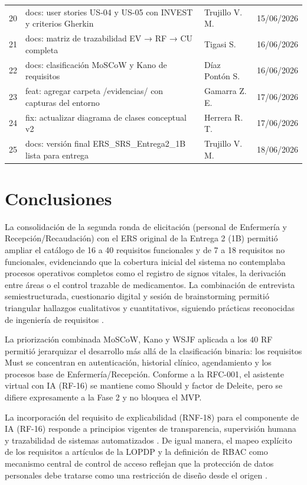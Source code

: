 \documentclass[11pt,a4paper]{article}
\begin{document}
\begin{longtable}{p{} p{} p{} p{}}
		20 & docs: user stories US-04 y US-05 con INVEST y criterios Gherkin & Trujillo V. M. & 15/06/2026 \\
		21 & docs: matriz de trazabilidad EV → RF → CU completa & Tigasi S. & 16/06/2026 \\
		22 & docs: clasificación MoSCoW y Kano de requisitos & Díaz Pontón S. & 16/06/2026 \\
		23 & feat: agregar carpeta /evidencias/ con capturas del entorno & Gamarra Z. E. & 17/06/2026 \\
		24 & fix: actualizar diagrama de clases conceptual v2 & Herrera R. T. & 17/06/2026 \\
		25 & docs: versión final ERS\_SRS\_Entrega2\_1B lista para entrega & Trujillo V. M. & 18/06/2026 \\
	\end{longtable}
	
	
	\section{Conclusiones}
	
	La consolidación de la segunda ronda de elicitación (personal de Enfermería y Recepción/Recaudación) con el ERS original de la Entrega 2 (1B) permitió ampliar el catálogo de 16 a 40 requisitos funcionales y de 7 a 18 requisitos no funcionales, evidenciando que la cobertura inicial del sistema no contemplaba procesos operativos completos como el registro de signos vitales, la derivación entre áreas o el control trazable de medicamentos. La combinación de entrevista semiestructurada, cuestionario digital y sesión de brainstorming permitió triangular hallazgos cualitativos y cuantitativos, siguiendo prácticas reconocidas de ingeniería de requisitos \cite{iso29148,nuseibeh2000,pohl2010}.
	
	La priorización combinada MoSCoW, Kano y WSJF aplicada a los 40 RF permitió jerarquizar el desarrollo más allá de la clasificación binaria: los requisitos Must se concentran en autenticación, historial clínico, agendamiento y los procesos base de Enfermería/Recepción. Conforme a la RFC-001, el asistente virtual con IA (RF-16) se mantiene como Should y factor de Deleite, pero se difiere expresamente a la Fase 2 y no bloquea el MVP.
	
	La incorporación del requisito de explicabilidad (RNF-18) para el componente de IA (RF-16) responde a principios vigentes de transparencia, supervisión humana y trazabilidad de sistemas automatizados \cite{whoai2021,euaiact2024,fda2022}. De igual manera, el mapeo explícito de los requisitos a artículos de la LOPDP y la definición de RBAC como mecanismo central de control de acceso reflejan que la protección de datos personales debe tratarse como una restricción de diseño desde el origen \cite{loppd,iso27799,sandhu2000}.
	
\end{document}
